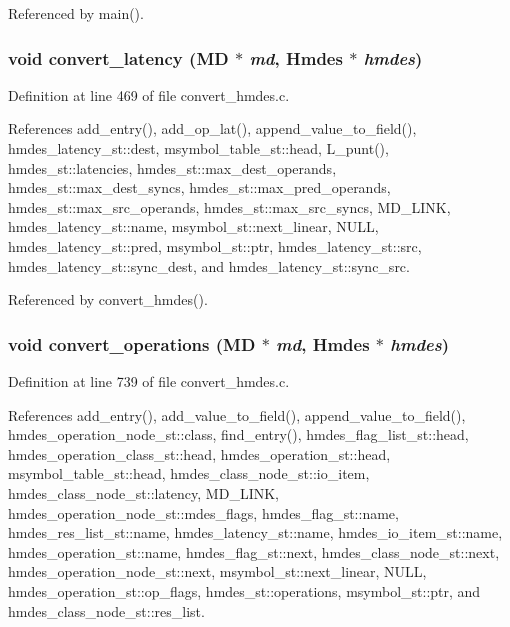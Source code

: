 Referenced by main().
\subsubsection{\setlength{\rightskip}{0pt plus 5cm}void convert\_\-latency (\bf{MD} $\ast$ {\em md}, \bf{Hmdes} $\ast$ {\em hmdes})}\label{convert__hmdes_8c_8d13d90966ee0a9fba3c647d2514e29c}




Definition at line 469 of file convert\_\-hmdes.c.

References add\_\-entry(), add\_\-op\_\-lat(), append\_\-value\_\-to\_\-field(), hmdes\_\-latency\_\-st::dest, msymbol\_\-table\_\-st::head, L\_\-punt(), hmdes\_\-st::latencies, hmdes\_\-st::max\_\-dest\_\-operands, hmdes\_\-st::max\_\-dest\_\-syncs, hmdes\_\-st::max\_\-pred\_\-operands, hmdes\_\-st::max\_\-src\_\-operands, hmdes\_\-st::max\_\-src\_\-syncs, MD\_\-LINK, hmdes\_\-latency\_\-st::name, msymbol\_\-st::next\_\-linear, NULL, hmdes\_\-latency\_\-st::pred, msymbol\_\-st::ptr, hmdes\_\-latency\_\-st::src, hmdes\_\-latency\_\-st::sync\_\-dest, and hmdes\_\-latency\_\-st::sync\_\-src.

Referenced by convert\_\-hmdes().
\subsubsection{\setlength{\rightskip}{0pt plus 5cm}void convert\_\-operations (\bf{MD} $\ast$ {\em md}, \bf{Hmdes} $\ast$ {\em hmdes})}\label{convert__hmdes_8c_4fb3226ec52c93c25bbf1f7daddd8c23}




Definition at line 739 of file convert\_\-hmdes.c.

References add\_\-entry(), add\_\-value\_\-to\_\-field(), append\_\-value\_\-to\_\-field(), hmdes\_\-operation\_\-node\_\-st::class, find\_\-entry(), hmdes\_\-flag\_\-list\_\-st::head, hmdes\_\-operation\_\-class\_\-st::head, hmdes\_\-operation\_\-st::head, msymbol\_\-table\_\-st::head, hmdes\_\-class\_\-node\_\-st::io\_\-item, hmdes\_\-class\_\-node\_\-st::latency, MD\_\-LINK, hmdes\_\-operation\_\-node\_\-st::mdes\_\-flags, hmdes\_\-flag\_\-st::name, hmdes\_\-res\_\-list\_\-st::name, hmdes\_\-latency\_\-st::name, hmdes\_\-io\_\-item\_\-st::name, hmdes\_\-operation\_\-st::name, hmdes\_\-flag\_\-st::next, hmdes\_\-class\_\-node\_\-st::next, hmdes\_\-operation\_\-node\_\-st::next, msymbol\_\-st::next\_\-linear, NULL, hmdes\_\-operation\_\-st::op\_\-flags, hmdes\_\-st::operations, msymbol\_\-st::ptr, and hmdes\_\-class\_\-node\_\-st::res\_\-list.

